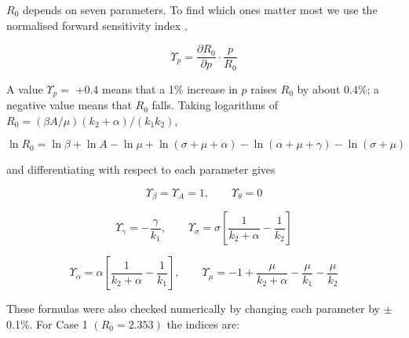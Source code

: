 \documentclass[12pt,a4paper]{article}
\theoremstyle{definition}
\begin{document}
$R_{0}$ depends on seven parameters. To find which ones matter most we use the normalised forward sensitivity index \cite{r14},


\begin{equation}
\Upsilon_p = \frac{\partial R_0}{\partial p}\cdot\frac{p}{R_0}
\end{equation}

A value $\Upsilon _{p} =$ +0.4 means that a 1\% increase in $p$ raises $R_{0}$ by about 0.4\%; a negative value means that $R_{0}$ falls. Taking logarithms of $R_{0} = (\beta A/\mu )(k_{2} + \alpha )/(k_{1}k_{2})$,


\begin{equation*}
\ln R_0 = \ln\beta+\ln A-\ln\mu+\ln(\sigma+\mu+\alpha)-\ln(\alpha+\mu+\gamma)-\ln(\sigma+\mu)
\end{equation*}

and differentiating with respect to each parameter gives


\begin{equation}
\Upsilon_\beta = \Upsilon_A = 1,\qquad \Upsilon_\theta = 0
\end{equation}

\begin{equation}
\Upsilon_\gamma = -\frac{\gamma}{k_1},\qquad \Upsilon_\sigma = \sigma\left[\frac{1}{k_2+\alpha}-\frac{1}{k_2}\right]
\end{equation}

\begin{equation}
\Upsilon_\alpha = \alpha\left[\frac{1}{k_2+\alpha}-\frac{1}{k_1}\right],\qquad \Upsilon_\mu = -1+\frac{\mu}{k_2+\alpha}-\frac{\mu}{k_1}-\frac{\mu}{k_2}
\end{equation}

These formulas were also checked numerically by changing each parameter by $\pm$0.1\%. For Case 1 $(R_{0} = 2.353)$ the indices are:
\end{document}
